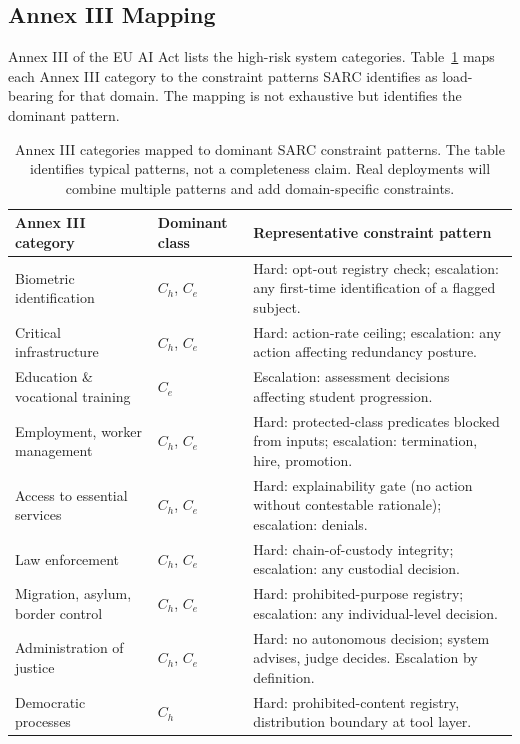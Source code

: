 \documentclass[11pt,a4paper]{article}
\theoremstyle{remark}
\begin{document}
\subsection{Annex III Mapping}\label{sec:annex3}

Annex III of the EU AI Act lists the high-risk system categories. Table~\ref{tab:annex3} maps each Annex III category to the constraint patterns SARC identifies as load-bearing for that domain. The mapping is not exhaustive but identifies the dominant pattern.

\begin{table}[h]
\centering\footnotesize
\begin{tabularx}{\textwidth}{@{}p{3.4cm}p{2.4cm}X@{}}
\toprule
\textbf{Annex III category} & \textbf{Dominant class} & \textbf{Representative constraint pattern} \\
\midrule
Biometric identification & $C_h$, $C_e$ & Hard: opt-out registry check; escalation: any first-time identification of a flagged subject. \\
Critical infrastructure & $C_h$, $C_e$ & Hard: action-rate ceiling; escalation: any action affecting redundancy posture. \\
Education \& vocational training & $C_e$ & Escalation: assessment decisions affecting student progression. \\
Employment, worker management & $C_h$, $C_e$ & Hard: protected-class predicates blocked from inputs; escalation: termination, hire, promotion. \\
Access to essential services & $C_h$, $C_e$ & Hard: explainability gate (no action without contestable rationale); escalation: denials. \\
Law enforcement & $C_h$, $C_e$ & Hard: chain-of-custody integrity; escalation: any custodial decision. \\
Migration, asylum, border control & $C_h$, $C_e$ & Hard: prohibited-purpose registry; escalation: any individual-level decision. \\
Administration of justice & $C_h$, $C_e$ & Hard: no autonomous decision; system advises, judge decides. Escalation by definition. \\
Democratic processes & $C_h$ & Hard: prohibited-content registry, distribution boundary at tool layer. \\
\bottomrule
\end{tabularx}
\caption{Annex III categories mapped to dominant SARC constraint patterns. The table identifies typical patterns, not a completeness claim. Real deployments will combine multiple patterns and add domain-specific constraints.}
\label{tab:annex3}
\end{table}
\end{document}
